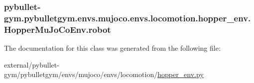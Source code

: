 \subsubsection[{\texorpdfstring{robot}{robot}}]{\setlength{\rightskip}{0pt plus 5cm}pybullet-\/gym.\+pybulletgym.\+envs.\+mujoco.\+envs.\+locomotion.\+hopper\+\_\+env.\+Hopper\+Mu\+Jo\+Co\+Env.\+robot}\hypertarget{classpybullet-gym_1_1pybulletgym_1_1envs_1_1mujoco_1_1envs_1_1locomotion_1_1hopper__env_1_1_hopper_mu_jo_co_env_ab489e88a7c25e05231895ff92ac8a568}{}\label{classpybullet-gym_1_1pybulletgym_1_1envs_1_1mujoco_1_1envs_1_1locomotion_1_1hopper__env_1_1_hopper_mu_jo_co_env_ab489e88a7c25e05231895ff92ac8a568}


The documentation for this class was generated from the following file\+:\begin{DoxyCompactItemize}
\item 
external/pybullet-\/gym/pybulletgym/envs/mujoco/envs/locomotion/\hyperlink{mujoco_2envs_2locomotion_2hopper__env_8py}{hopper\+\_\+env.\+py}\end{DoxyCompactItemize}
